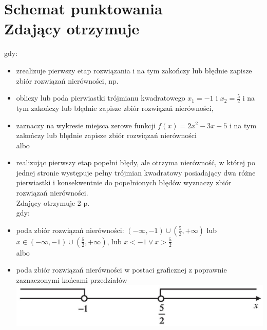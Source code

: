 \documentclass[10pt]{article}
\begin{document}
\section*{Schemat punktowania \\
 Zdający otrzymuje}
gdy:

\begin{itemize}
  \item zrealizuje pierwszy etap rozwiązania i na tym zakończy lub błędnie zapisze zbiór rozwiązań nierówności, np.
  \item obliczy lub poda pierwiastki trójmianu kwadratowego $x_{1}=-1$ i $x_{2}=\frac{5}{2}$ i na tym zakończy lub błędnie zapisze zbiór rozwiązań nierówności,
  \item zaznaczy na wykresie miejsca zerowe funkcji $f(x)=2 x^{2}-3 x-5$ i na tym zakończy lub błędnie zapisze zbiór rozwiązań nierówności\\
albo
  \item realizując pierwszy etap popełni błędy, ale otrzyma nierówność, w której po jednej stronie występuje pełny trójmian kwadratowy posiadający dwa różne pierwiastki i konsekwentnie do popełnionych błędów wyznaczy zbiór rozwiązań nierówności.\\
Zdający otrzymuje 2 p.\\
gdy:
  \item poda zbiór rozwiązań nierówności: $(-\infty,-1) \cup\left(\frac{5}{2},+\infty\right)$ lub $x \in(-\infty,-1) \cup\left(\frac{5}{2},+\infty\right)$, lub $x<-1 \vee x>\frac{5}{2}$\\
albo
  \item poda zbiór rozwiązań nierówności w postaci graficznej z poprawnie zaznaczonymi końcami przedziałów\\
\includegraphics[max width=\textwidth, center]{2025_02_07_a74eed68a1a2147a06fdg-07}
\end{itemize}
\end{document}
